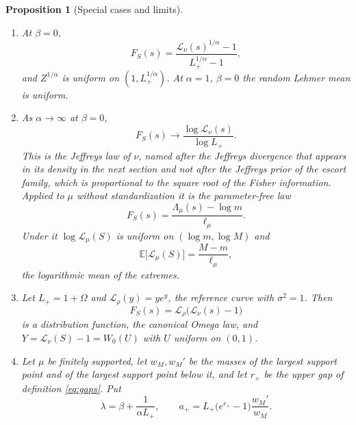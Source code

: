 \documentclass[sn-mathphys-num]{sn-jnl}\newcommand{\SNJNL}{}
\theoremstyle{thmstyleone}
\newtheorem{proposition}{Proposition}
\theoremstyle{thmstyletwo}
\theoremstyle{thmstylethree}
\theoremstyle{thmstyleone}
\providecommand{\E}{\mathbb{E}}
\providecommand{\Leh}{\mathscr{L}}
\begin{document}
	\begin{proposition}[Special cases and limits]
		\label{prop:limits}\leavevmode
		\begin{enumerate}[label=\textup{(\roman*)},leftmargin=2.2em]
			\item At $\beta=0$,
			\begin{equation}\label{eq:powermap}
				F_S(s)=\frac{\Leh_\nu(s)^{1/\alpha}-1}{L_+^{1/\alpha}-1},
			\end{equation}
			and $Z^{1/\alpha}$ is uniform on $(1,L_+^{1/\alpha})$. At
			$\alpha=1$, $\beta=0$ the random Lehmer mean is uniform.
			\item As $\alpha\to\infty$ at $\beta=0$,
			\begin{equation}\label{eq:jeffreysF}
				F_S(s)\longrightarrow\frac{\log\Leh_\nu(s)}{\log L_+} .
			\end{equation}
			This is the \emph{Jeffreys law} of $\nu$, named after the
			Jeffreys divergence that appears in its density in the next
			section and not after the Jeffreys prior of the escort family,
			which is proportional to the square root of the Fisher
			information. Applied to $\mu$ without standardization it is the
			parameter-free law
			\begin{equation}\label{eq:jeffreysraw}
				F_S(s)=\frac{\Lambda_\mu(s)-\log m}{\ell_\mu} .
			\end{equation}
			Under it $\log\Leh_\mu(S)$ is uniform on $(\log m,\log M)$ and
			\begin{equation}\label{eq:logmean}
				\E\bigl[\Leh_\mu(S)\bigr]=\frac{M-m}{\ell_\mu},
			\end{equation}
			the logarithmic mean of the extremes.
			\item Let $L_+=1+\Omega$ and $\Leh_\rho(y)=ye^{y}$, the reference curve
			with $\sigma^{2}=1$. Then
			\begin{equation}\label{eq:canonical}
				F_S(s)=\Leh_\rho\bigl(\Leh_\nu(s)-1\bigr)
			\end{equation}
			is a distribution function, the \emph{canonical Omega law}, and
			$Y=\Leh_\nu(S)-1=W_0(U)$ with $U$ uniform on $(0,1)$.
			\item Let $\mu$ be finitely supported, let $w_M,w_M'$ be the masses
			of the largest support point and of the largest support point
			below it, and let $r_+$ be the upper gap of definition
			\eqref{eq:gaps}. Put
			\begin{equation}\label{eq:lambdaa}
				\lambda=\beta+\frac{1}{\alpha L_+},
				\qquad
				a_+=L_+\bigl(e^{r_+}-1\bigr)\frac{w_M'}{w_M} .

\end{equation}
\end{enumerate}
\end{proposition}
\end{document}
